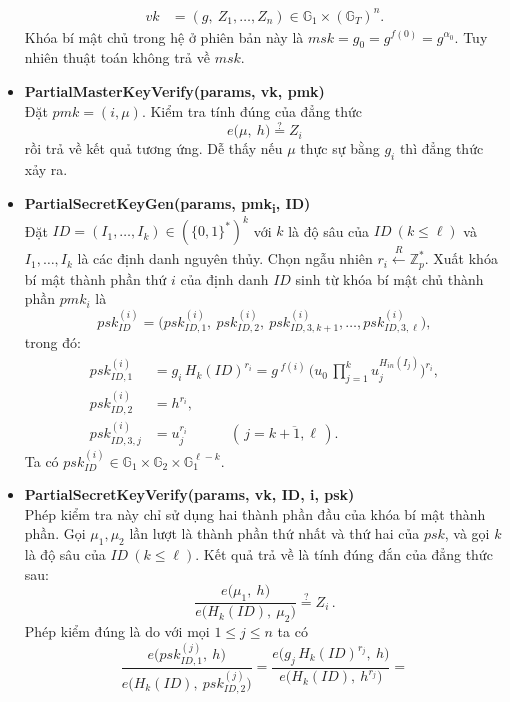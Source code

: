\documentclass[class=report, crop=false]{standalone}
\begin{document}
\begin{itemize}[leftmargin=1cm, itemindent=-1cm]
\begin{align*}
				vk &= (g,\ Z_1, \dots, Z_n) \in \mathbb{G}_1 \times (\mathbb{G}_T)^n.
			\end{align*}
			Khóa bí mật chủ trong hệ ở phiên bản này là $msk = g_0 = g^{f(0)} = g^{\alpha_0}$. Tuy nhiên thuật toán không trả về $msk$.
			\item[] {\sffamily\bfseries PartialMasterKeyVerify(params, vk, pmk)} \\
			Đặt $pmk = (i, \mu)$. Kiểm tra tính đúng của đẳng thức
			\[
				e \Big(\mu,\ h \Big) \overset{?}{=} Z_i
			\]
			rồi trả về kết quả tương ứng. Dễ thấy nếu $\mu$ thực sự bằng $g_i$ thì đẳng thức xảy ra.
			\item[] {\sffamily\bfseries PartialSecretKeyGen(params, pmk\textsubscript{i}, ID)} \\
			Đặt $ID = (I_1, \dots, I_k) \in (\{0, 1 \}^*)^k$ với $k$ là độ sâu của $ID \ (k \leq \ell)$ và $I_1, \dots, I_k$ là các định danh nguyên thủy. Chọn ngẫu nhiên $r_i \xleftarrow{R} \mathbb{Z}_p^*$. Xuất khóa bí mật thành phần thứ $i$ của định danh $ID$ sinh từ khóa bí mật chủ thành phần $pmk_i$ là
			\[
				psk_{ID}^{(i)} = \Big(psk_{ID, 1}^{(i)},\ psk_{ID, 2}^{(i)},\ psk_{ID, 3, k + 1}^{(i)}, \dots, psk_{ID, 3, \ell}^{(i)} \Big),
			\]
			trong đó:
			\vspace{-\baselineskip}
			\begin{align*}
				psk_{ID, 1}^{(i)} &= g_i\, H_{k}(ID)^{r_i} = g\,^{f(i)}\, \Big(u_0 \, \prod_{j = 1}^k u_j^{H_{in}(I_j)} \Big)^{r_i}, \\
				psk_{ID, 2}^{(i)} &= h^{r_i}, \\
				psk_{ID, 3, j}^{(i)} &= u_j^{r_i} \quad\quad\quad (\, j = \overline{k + 1, \ell}\,).
			\end{align*}
			Ta có $psk_{ID}^{(i)} \in \mathbb{G}_1 \times \mathbb{G}_2 \times \mathbb{G}_1^{\ell - k}$.
			\item[] {\sffamily\bfseries PartialSecretKeyVerify(params, vk, ID, i, psk)} \\
			Phép kiểm tra này chỉ sử dụng hai thành phần đầu của khóa bí mật thành phần. Gọi $\mu_1, \mu_2$ lần lượt là thành phần thứ nhất và thứ hai của $psk$, và gọi $k$ là độ sâu của $ID \ (k \leq \ell)$. Kết quả trả về là tính đúng đắn của đẳng thức sau:
			\[
				\frac{e \Big(\mu_1,\ h \Big)}{e \Big(H_{k}(ID),\ \mu_2 \Big)} \overset{?}{=} Z_i \,.
			\]
			Phép kiểm đúng là do với mọi $1 \leq j \leq n$ ta có
			\[
				\frac{e \Big(psk_{ID, 1}^{(j)},\ h \Big)}{e \Big(H_{k}(ID),\ psk_{ID, 2}^{(j)} \Big)} =
				\frac{e \Big(g_j\, H_{k}(ID)^{r_j},\ h \Big)}{e \Big(H_{k}(ID),\ h^{r_j} \Big)} =
\]
\end{itemize}
\end{document}
